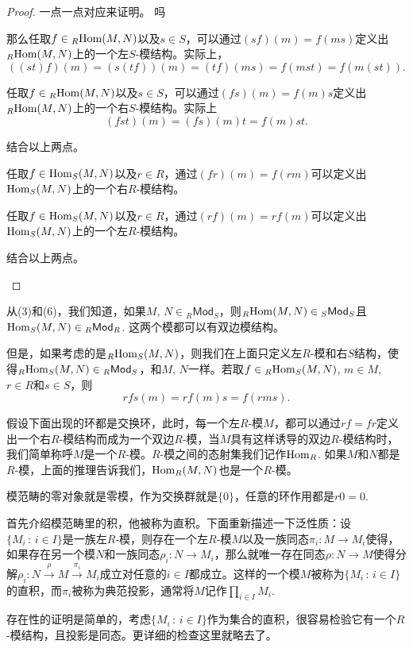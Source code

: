 \begin{proof}
一点一点对应来证明。
 吗            
\begin{compactenum}[(1)]
\item 那么任取$f\in {}_R\!\operatorname{Hom}(M,N)$以及$s\in S$，可以通过$(sf)(m)=f(ms)$定义出${}_R\!\operatorname{Hom}(M,N)$上的一个左$S$-模结构。实际上，
\[
	((st)f)(m)=(s(tf))(m)=(tf)(ms)=f(mst)=f(m(st)).
\]

\item 任取$f\in {}_R\!\operatorname{Hom}(M,N)$以及$s\in S$，可以通过$(fs)(m)=f(m)s$定义出${}_R\!\operatorname{Hom}(M,N)$上的一个右$S$-模结构。实际上
\[
	(fst)(m)=(fs)(m)t=f(m)st.
\]

\item 结合以上两点。

\item 任取$f\in \operatorname{Hom}_S(M,N)$以及$r\in R$，通过$(fr)(m)=f(rm)$可以定义出$\operatorname{Hom}_S(M,N)$上的一个右$R$-模结构。

\item 任取$f\in \operatorname{Hom}_S(M,N)$以及$r\in R$，通过$(rf)(m)=rf(m)$可以定义出$\operatorname{Hom}_S(M,N)$上的一个左$R$-模结构。

\item 结合以上两点。\qedhere
\end{compactenum}
\end{proof}

从(3)和(6)，我们知道，如果$M$, $N\in {}_R\mathsf{Mod}_S$，则${}_R\!\operatorname{Hom}(M,N)\in {}_S\mathsf{Mod}_S$且$\operatorname{Hom}_S(M,N)\in {}_R\mathsf{Mod}_R$. 这两个模都可以有双边模结构。

但是，如果考虑的是${}_R\!\operatorname{Hom}_S(M,N)$，则我们在上面只定义左$R$-模和右$S$结构，使得${}_R\!\operatorname{Hom}_S(M,N)\in {}_R\mathsf{Mod}_S$，和$M$, $N$一样。若取$f\in {}_R\!\operatorname{Hom}_S(M,N)$, $m\in M$, $r\in R$和$s\in S$，则
\[
	rfs(m)=rf(m)s=f(rms).
\]

假设下面出现的环都是交换环，此时，每一个左$R$-模$M$，都可以通过$rf=fr$定义出一个右$R$-模结构而成为一个双边$R$-模，当$M$具有这样诱导的双边$R$-模结构时，我们简单称呼$M$是一个$R$-模。$R$-模之间的态射集我们记作$\operatorname{Hom}_R$. 如果$M$和$N$都是$R$-模，上面的推理告诉我们，$\operatorname{Hom}_R(M,N)$也是一个$R$-模。

\begin{para}[零对象]
模范畴的零对象就是零模，作为交换群就是$\{0\}$，任意的环作用都是$r0=0$.
\end{para}

\begin{para}[直积]
首先介绍模范畴里的积，他被称为直积。下面重新描述一下泛性质：设$\{M_i\,:\, i\in I\}$是一族左$R$-模，则存在一个左$R$-模$M$以及一族同态$\pi_i:M\to M_i$使得，如果存在另一个模$N$和一族同态$\rho_i:N\to M_i$，那么就唯一存在同态$\rho:N\to M$使得分解$\rho_i:N\xrightarrow{\rho} M \xrightarrow{\pi_i} M_i$成立对任意的$i\in I$都成立。这样的一个模$M$被称为$\{M_i\,:\, i\in I\}$的直积，而$\pi_i$被称为典范投影，通常将$M$记作$\prod_{i\in I}M_i$. 

存在性的证明是简单的，考虑$\{M_i\,:\, i\in I\}$作为集合的直积，很容易检验它有一个$R$-模结构，且投影是同态。更详细的检查这里就略去了。
\end{para}

